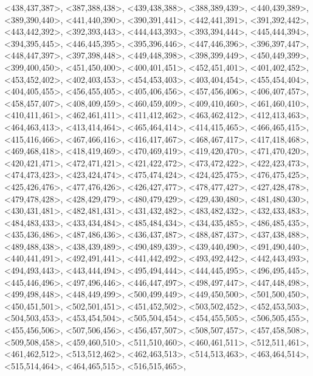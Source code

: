 \documentclass[a4paper,10pt]{article}
\begin{document}
\begin{eulernotebook}
\begin{euleroutput}
  <438,437,387>,
  <387,388,438>,
  <439,438,388>,
  <388,389,439>,
  <440,439,389>,
  <389,390,440>,
  <441,440,390>,
  <390,391,441>,
  <442,441,391>,
  <391,392,442>,
  <443,442,392>,
  <392,393,443>,
  <444,443,393>,
  <393,394,444>,
  <445,444,394>,
  <394,395,445>,
  <446,445,395>,
  <395,396,446>,
  <447,446,396>,
  <396,397,447>,
  <448,447,397>,
  <397,398,448>,
  <449,448,398>,
  <398,399,449>,
  <450,449,399>,
  <399,400,450>,
  <451,450,400>,
  <400,401,451>,
  <452,451,401>,
  <401,402,452>,
  <453,452,402>,
  <402,403,453>,
  <454,453,403>,
  <403,404,454>,
  <455,454,404>,
  <404,405,455>,
  <456,455,405>,
  <405,406,456>,
  <457,456,406>,
  <406,407,457>,
  <458,457,407>,
  <408,409,459>,
  <460,459,409>,
  <409,410,460>,
  <461,460,410>,
  <410,411,461>,
  <462,461,411>,
  <411,412,462>,
  <463,462,412>,
  <412,413,463>,
  <464,463,413>,
  <413,414,464>,
  <465,464,414>,
  <414,415,465>,
  <466,465,415>,
  <415,416,466>,
  <467,466,416>,
  <416,417,467>,
  <468,467,417>,
  <417,418,468>,
  <469,468,418>,
  <418,419,469>,
  <470,469,419>,
  <419,420,470>,
  <471,470,420>,
  <420,421,471>,
  <472,471,421>,
  <421,422,472>,
  <473,472,422>,
  <422,423,473>,
  <474,473,423>,
  <423,424,474>,
  <475,474,424>,
  <424,425,475>,
  <476,475,425>,
  <425,426,476>,
  <477,476,426>,
  <426,427,477>,
  <478,477,427>,
  <427,428,478>,
  <479,478,428>,
  <428,429,479>,
  <480,479,429>,
  <429,430,480>,
  <481,480,430>,
  <430,431,481>,
  <482,481,431>,
  <431,432,482>,
  <483,482,432>,
  <432,433,483>,
  <484,483,433>,
  <433,434,484>,
  <485,484,434>,
  <434,435,485>,
  <486,485,435>,
  <435,436,486>,
  <487,486,436>,
  <436,437,487>,
  <488,487,437>,
  <437,438,488>,
  <489,488,438>,
  <438,439,489>,
  <490,489,439>,
  <439,440,490>,
  <491,490,440>,
  <440,441,491>,
  <492,491,441>,
  <441,442,492>,
  <493,492,442>,
  <442,443,493>,
  <494,493,443>,
  <443,444,494>,
  <495,494,444>,
  <444,445,495>,
  <496,495,445>,
  <445,446,496>,
  <497,496,446>,
  <446,447,497>,
  <498,497,447>,
  <447,448,498>,
  <499,498,448>,
  <448,449,499>,
  <500,499,449>,
  <449,450,500>,
  <501,500,450>,
  <450,451,501>,
  <502,501,451>,
  <451,452,502>,
  <503,502,452>,
  <452,453,503>,
  <504,503,453>,
  <453,454,504>,
  <505,504,454>,
  <454,455,505>,
  <506,505,455>,
  <455,456,506>,
  <507,506,456>,
  <456,457,507>,
  <508,507,457>,
  <457,458,508>,
  <509,508,458>,
  <459,460,510>,
  <511,510,460>,
  <460,461,511>,
  <512,511,461>,
  <461,462,512>,
  <513,512,462>,
  <462,463,513>,
  <514,513,463>,
  <463,464,514>,
  <515,514,464>,
  <464,465,515>,
  <516,515,465>,

\end{euleroutput}
\end{eulernotebook}
\end{document}
